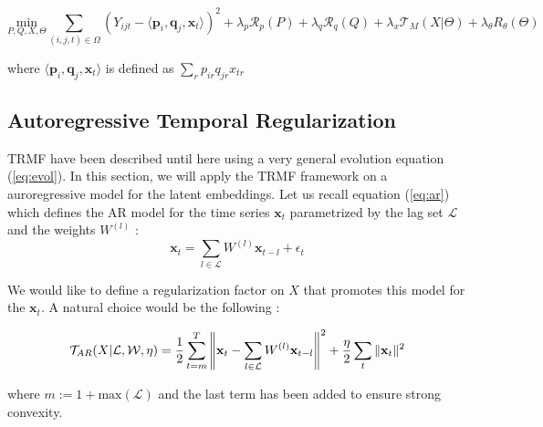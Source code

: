 \documentclass{article}
\begin{document}
\begin{equation}
\underset{P,Q,X,\Theta}{\text{min}} \sum_{(i,j,t) \in \Omega} (Y_{ijt} - \langle \mathbf{p}_i,\mathbf{q}_j,\mathbf{x}_t \rangle )^2 + \lambda_p \mathcal{R}_p(P) + \lambda_q \mathcal{R}_q(Q) + \lambda_x \mathcal{T}_M(X | \Theta) + \lambda_{\theta} R_{\theta}(\Theta)
\label{eq:model_tensor}
\end{equation}

where $\langle \mathbf{p}_i,\mathbf{q}_j,\mathbf{x}_t \rangle$ is defined as $\sum_r p_{ir}q_{jr}x_{tr}$

\subsection*{Autoregressive Temporal Regularization}
TRMF have been described until here using a very general evolution equation (\ref{eq:evol}). In this section, we will apply the TRMF framework on a auroregressive model for the latent embeddings. Let us recall equation (\ref{eq:ar}) which defines the AR model for the time series $\mathbf{x}_t$ parametrized by the lag set $\mathcal{L}$ and the weights $W^{(l)}$ :
$$\mathbf{x}_t = \sum_{l \in \mathcal{L}} W^{(l)} \mathbf{x}_{t-l} + \epsilon_t$$

We would like to define a regularization factor on $X$ that promotes this model for the $\mathbf{x}_t$. A natural choice would be the following :

\begin{equation}
\mathcal{T}_{AR}(X|\mathcal{L}, \mathcal{W}, \eta) = \frac{1}{2} \sum_{t=m}^T \left\lVert\mathbf{x}_t - \sum_{l \in \mathcal{L}} W^{(l)} \mathbf{x}_{t-l}\right\rVert^2 + \frac{\eta}{2} \sum_t \|\mathbf{x}_t\|^2
\label{eq:tar}
\end{equation}

where $m := 1+\text{max}(\mathcal{L})$ and the last term has been added to ensure strong convexity. \\
\end{document}
